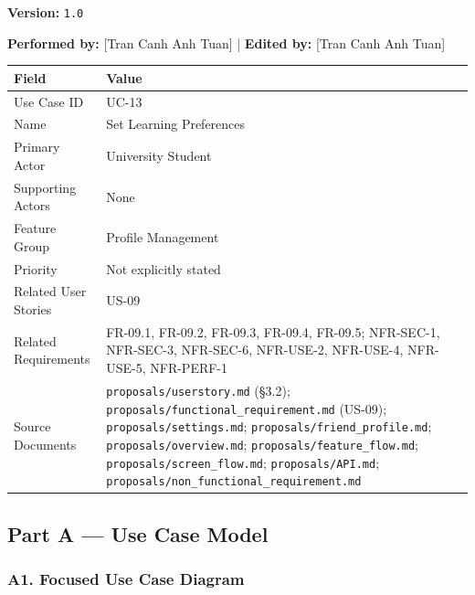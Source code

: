 \documentclass[12pt]{article}
\renewcommand{\baselinestretch}{1.5}
\begin{document}
\textbf{Version:} \texttt{1.0}
\par\medskip

\textbf{Performed by:} [Tran Canh Anh Tuan] | \textbf{Edited by:} [Tran Canh Anh Tuan]
\par\medskip

\begingroup
\small
\renewcommand{\baselinestretch}{1.0}\selectfont
\renewcommand{\arraystretch}{1.15}
\setlength{\tabcolsep}{6pt}
\begin{longtable}{|>{\raggedright\arraybackslash}p{}|>{\raggedright\arraybackslash}p{}|}
\hline
\textbf{Field} & \textbf{Value} \\ \hline
\endhead
Use Case ID & UC-13 \\ \hline
Name & Set Learning Preferences \\ \hline
Primary Actor & University Student \\ \hline
Supporting Actors & None \\ \hline
Feature Group & Profile Management \\ \hline
Priority & Not explicitly stated \\ \hline
Related User Stories & US-09 \\ \hline
Related Requirements & FR-09.1, FR-09.2, FR-09.3, FR-09.4, FR-09.5; NFR-SEC-1, NFR-SEC-3, NFR-SEC-6, NFR-USE-2, NFR-USE-4, NFR-USE-5, NFR-PERF-1 \\ \hline
Source Documents & \texttt{proposals/userstory.md} (§3.2); \texttt{proposals/functional\_requirement.md} (US-09); \texttt{proposals/settings.md}; \texttt{proposals/friend\_profile.md}; \texttt{proposals/overview.md}; \texttt{proposals/feature\_flow.md}; \texttt{proposals/screen\_flow.md}; \texttt{proposals/API.md}; \texttt{proposals/non\_functional\_requirement.md} \\ \hline
\end{longtable}
\endgroup
\par\medskip

\hypertarget{sec:part-a-use-case-model}{}
\subsection*{Part A --- Use Case Model}
\par\medskip

\hypertarget{sec:a1-focused-use-case-diagram}{}
\subsubsection*{A1. Focused Use Case Diagram}
\par\medskip
\end{document}
